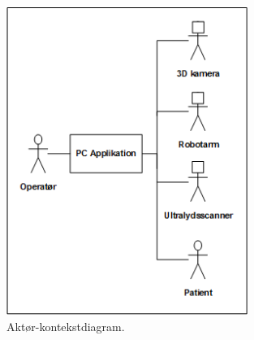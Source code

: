 \begin{figure}[H]
    \centering
    \includegraphics[width=0.70\textwidth]{figurer/d/Kravspecifikation/uml_aktor}
    \caption{Aktør-kontekstdiagram.}
    \label{akDiagram}
\end{figure}